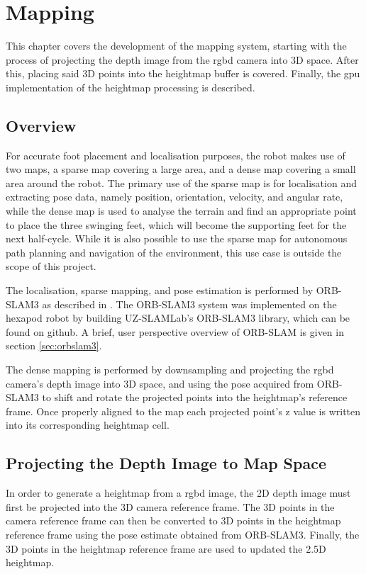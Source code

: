 \chapter{Mapping} \label{chap:mapping}
    This chapter covers the development of the mapping system, starting with the process of projecting the depth image from the \ac{rgbd} camera into 3D space. After this, placing said 3D points into the heightmap buffer is covered. Finally, the \ac{gpu} implementation of the heightmap processing is described.
    \section{Overview}
        For accurate foot placement and localisation purposes, the robot makes use of two maps, a sparse map covering a large area, and a dense map covering a small area around the robot. The primary use of the sparse map is for localisation and extracting pose data, namely position, orientation, velocity, and angular rate, while the dense map is used to analyse the terrain and find an appropriate point to place the three swinging feet, which will become the supporting feet for the next half-cycle. While it is also possible to use the sparse map for autonomous path planning and navigation of the environment, this use case is outside the scope of this project.

        The localisation, sparse mapping, and pose estimation is performed by ORB-SLAM3 as described in \cite{campos2021orb}. The ORB-SLAM3 system was implemented on the hexapod robot by building UZ-SLAMLab's ORB-SLAM3 library, which can be found on github. A brief, user perspective overview of ORB-SLAM is given in section \ref{sec:orbslam3}.

        The dense mapping is performed by downsampling and projecting the \ac{rgbd} camera's depth image into 3D space, and using the pose acquired from ORB-SLAM3 to shift and rotate the projected points into the heightmap's reference frame. Once properly aligned to the map each projected point's z value is written into its corresponding heightmap cell.

    \section{Projecting the Depth Image to Map Space}
        In order to generate a heightmap from a \ac{rgbd} image, the 2D depth image must first be projected into the 3D camera reference frame. The 3D points in the camera reference frame can then be converted to 3D points in the heightmap reference frame using the pose estimate obtained from ORB-SLAM3. Finally, the 3D points in the heightmap reference frame are used to updated the 2.5D heightmap.

